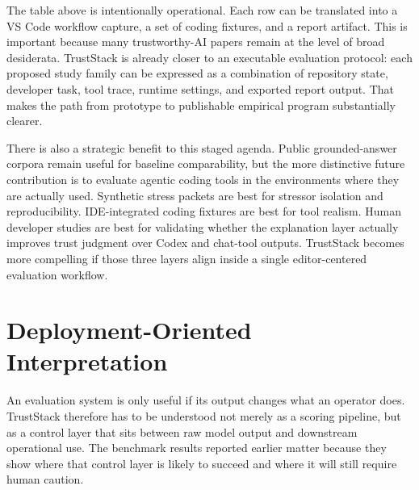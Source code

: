 \documentclass[conference]{IEEEtran}
\newcommand{\TrustSection}[1]{\section{\texorpdfstring{\textcolor{TrustStackBlue}{#1}}{#1}}}
\begin{document}
The table above is intentionally operational. Each row can be translated into a VS Code workflow capture, a set of coding fixtures, and a report artifact. This is important because many trustworthy-AI papers remain at the level of broad desiderata. TrustStack is already closer to an executable evaluation protocol: each proposed study family can be expressed as a combination of repository state, developer task, tool trace, runtime settings, and exported report output. That makes the path from prototype to publishable empirical program substantially clearer.

There is also a strategic benefit to this staged agenda. Public grounded-answer corpora remain useful for baseline comparability, but the more distinctive future contribution is to evaluate agentic coding tools in the environments where they are actually used. Synthetic stress packets are best for stressor isolation and reproducibility. IDE-integrated coding fixtures are best for tool realism. Human developer studies are best for validating whether the explanation layer actually improves trust judgment over Codex and chat-tool outputs. TrustStack becomes more compelling if those three layers align inside a single editor-centered evaluation workflow.

\TrustSection{Deployment-Oriented Interpretation}
An evaluation system is only useful if its output changes what an operator does. TrustStack therefore has to be understood not merely as a scoring pipeline, but as a control layer that sits between raw model output and downstream operational use. The benchmark results reported earlier matter because they show where that control layer is likely to succeed and where it will still require human caution.
\end{document}
